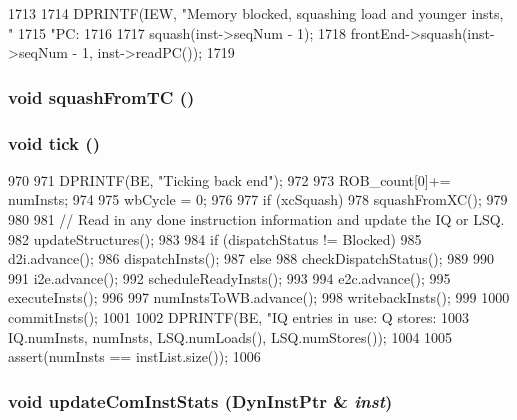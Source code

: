 \begin{DoxyCode}
1713 {
1714     DPRINTF(IEW, "Memory blocked, squashing load and younger insts, "
1715             "PC: %
1716 
1717     squash(inst->seqNum - 1);
1718     frontEnd->squash(inst->seqNum - 1, inst->readPC());
1719 }
\end{DoxyCode}
\hypertarget{classBackEnd_a24cd8db837a73b879041bf33da7b2064}{
\subsubsection[{squashFromTC}]{\setlength{\rightskip}{0pt plus 5cm}void squashFromTC ()}}
\label{classBackEnd_a24cd8db837a73b879041bf33da7b2064}
\hypertarget{classBackEnd_a873dd91783f9efb4a590aded1f70d6b0}{
\subsubsection[{tick}]{\setlength{\rightskip}{0pt plus 5cm}void tick ()}}
\label{classBackEnd_a873dd91783f9efb4a590aded1f70d6b0}



\begin{DoxyCode}
970 {
971     DPRINTF(BE, "Ticking back end\n");
972 
973     ROB_count[0]+= numInsts;
974 
975     wbCycle = 0;
976 
977     if (xcSquash) {
978         squashFromXC();
979     }
980 
981     // Read in any done instruction information and update the IQ or LSQ.
982     updateStructures();
983 
984     if (dispatchStatus != Blocked) {
985         d2i.advance();
986         dispatchInsts();
987     } else {
988         checkDispatchStatus();
989     }
990 
991     i2e.advance();
992     scheduleReadyInsts();
993 
994     e2c.advance();
995     executeInsts();
996 
997     numInstsToWB.advance();
998     writebackInsts();
999 
1000     commitInsts();
1001 
1002     DPRINTF(BE, "IQ entries in use: %
      Q stores: %
1003             IQ.numInsts, numInsts, LSQ.numLoads(), LSQ.numStores());
1004 
1005     assert(numInsts == instList.size());
1006 }
\end{DoxyCode}
\hypertarget{classBackEnd_a5bbf266cb0cc97eed138c8fe0d2d76b6}{
\subsubsection[{updateComInstStats}]{\setlength{\rightskip}{0pt plus 5cm}void updateComInstStats ({\bf DynInstPtr} \& {\em inst})}}
\label{classBackEnd_a5bbf266cb0cc97eed138c8fe0d2d76b6}



